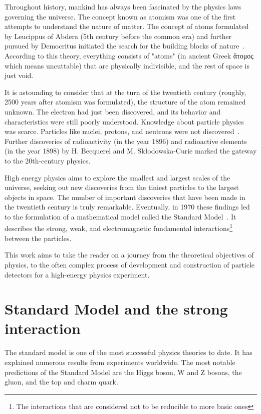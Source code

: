 Throughout history, mankind has always been fascinated by the physics laws governing the universe. The concept known as atomism was one of the first attempts to understand the nature of matter. The concept of atoms formulated by Leucippus of Abdera (5th century before the common era) and further pursued by Democritus initiated the search for the building blocks of nature~\cite{sep-atomism-ancient}. According to this theory, everything consists of "atoms" (in ancient Greek \foreignlanguage{greek}{ἄτομος} which means uncuttable) that are physically indivisible, and the rest of space is just void. 

It is astounding to consider that at the turn of the twentieth century (roughly, 2500 years after atomism was formulated), the structure of the atom remained unknown. The electron had just been discovered, and its behavior and characteristics were still poorly understood. Knowledge about particle physics was scarce. Particles like nuclei, protons, and neutrons were not discovered~\cite{intro_particle_physics}. 
Further discoveries of radioactivity (in the year 1896) and radioactive elements (in the year 1898) by H. Becquerel and M. Skłodowska-Curie marked the gateway to the 20th-century physics. 

High energy physics aims to explore the smallest and largest scales of the universe, seeking out new discoveries from the tiniest particles to the largest objects in space.
The number of important discoveries that have been made in the twentieth century is truly remarkable. Eventually, in 1970 these findings led to the formulation of a mathematical model called the Standard Model~\cite{intro_particle_physics}.  It describes the strong, weak, and electromagnetic fundamental interactions\footnote{The interactions that are considered not to be reducible to more basic ones} between the particles. 
 
 
 This work aims to take the reader on a journey from the theoretical objectives of physics, to the often complex process of development and construction of particle detectors for a high-energy physics experiment.
 
\section{Standard Model and the strong interaction}

The standard model is one of the most successful physics theories to date. It has explained numerous results from experiments worldwide. The most notable predictions of the Standard Model are the Higgs boson, W and Z bosons, the gluon, and the top and charm quark.

